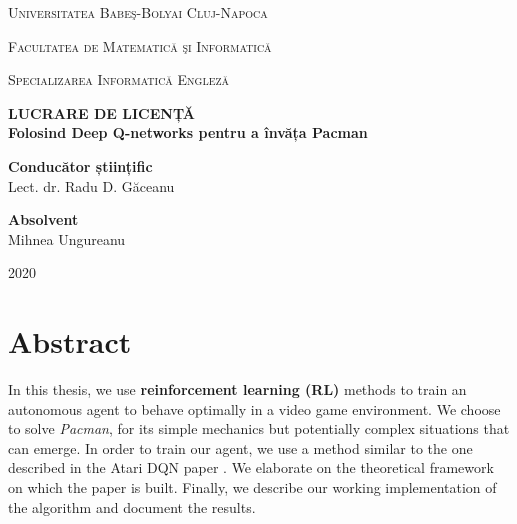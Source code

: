 \documentclass[12pt,twoside]{report}
\newcommand\blankpage{%
    \null
    \thispagestyle{empty}%
    \addtocounter{page}{-1}%
    \newpage}
\begin{document}
\begin{titlepage}
    \center %
    
    {\scshape\LARGE Universitatea Babeş-Bolyai Cluj-Napoca \par}
    \vspace{0.125cm}
    {\scshape\LARGE Facultatea de Matematică şi Informatică \par}
    \vspace{0.125cm}
    {\scshape\LARGE Specializarea Informatică Engleză \par}
    \vspace{5cm}
    
    {
        \bfseries
        \LARGE LUCRARE DE LICENȚĂ \\[1.5cm]
        \huge Folosind Deep Q-networks pentru a învăța Pacman
    }\\[4cm]
    
    \begin{flushleft}
        \Large
            \textbf{Conducător științific}
            \vspace{0.2cm}\\
        \Large
            Lect. dr. Radu D. Găceanu
            \vspace{0.125cm}\\
    \end{flushleft}
    
    \begin{flushright}
        \Large
            \textbf{Absolvent}
            \vspace{0.2cm}\\
        \Large
            Mihnea Ungureanu
    \end{flushright}
    
    \vfill
    
    {\center \large 2020}
    
\end{titlepage}

\blankpage

\chapter*{Abstract}
In this thesis, we use \textbf{reinforcement learning (RL)} methods to train an autonomous agent to behave optimally in a video game environment.
We choose to solve \emph{Pacman}, for its simple mechanics but potentially complex situations that can emerge.
In order to train our agent, we use a method similar to the one described in the Atari DQN paper \cite{atari-dqn}.
We elaborate on the theoretical framework on which the paper is built.
Finally, we describe our working implementation of the algorithm and document the results.
\end{document}
